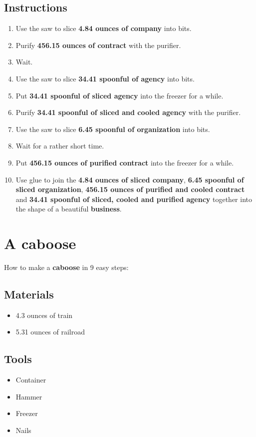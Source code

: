 \documentclass{article}
\begin{document}
\subsection{Instructions}\begin{enumerate}
\item 
Use the saw to slice \textbf{4.84 ounces of company} into bits.
\item 
Purify \textbf{456.15 ounces of contract} with the purifier.
\item 
Wait.
\item 
Use the saw to slice \textbf{34.41 spoonful of agency} into bits.
\item 
Put \textbf{34.41 spoonful of sliced agency} into the freezer for a while.
\item 
Purify \textbf{34.41 spoonful of sliced and cooled agency} with the purifier.
\item 
Use the saw to slice \textbf{6.45 spoonful of organization} into bits.
\item 
Wait for a rather short time.
\item 
Put \textbf{456.15 ounces of purified contract} into the freezer for a while.
\item 
Use glue to join the \textbf{4.84 ounces of sliced company}, \textbf{6.45 spoonful of sliced organization}, \textbf{456.15 ounces of purified and cooled contract} and \textbf{34.41 spoonful of sliced, cooled and purified agency} together into the shape of a beautiful \textbf{business}.
\end{enumerate}
\newpage
\section{A caboose}How to make a \textbf{caboose} in 9 easy steps:

\subsection{Materials}\begin{itemize}
\item 
4.3 ounces of train
\item 
5.31 ounces of railroad
\end{itemize}
\subsection{Tools}\begin{itemize}
\item 
Container
\item 
Hammer
\item 
Freezer
\item 
Nails
\end{itemize}
\end{document}
